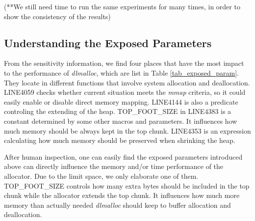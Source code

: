 (**We still need time to run the same experiments for many times, in order to show the consistency of the results)

\subsection{Understanding the Exposed Parameters}

\begin{table*}[htbp]
\centering
\caption{Exposed Parameters}
\label{tab_exposed_param}
\end{table*}
From the sensitivity information, we find four places that have the most impact to the performance of \emph{dlmalloc}, which are list in Table \ref{tab_exposed_param}. They locate in different functions that involve system allocation and deallocation. LINE4059 checks whether current situation meets the \emph{mmap} criteria, so it could easily enable or disable direct memory mapping. LINE4144 is also a predicate controling the extending of the heap. TOP\_FOOT\_SIZE in LINE4383 is a constant determined by some other macros and parameters. It influences how much memory should be always kept in the top chunk. LINE4353 is an expression calculating how much memory should be preserved when shrinking the heap.

After human inspection, one can easily find the exposed parameters introduced above can directly influence the memory and/or time performance of the allocator. Due to the limit space, we only elaborate one of them. TOP\_FOOT\_SIZE controls how many extra bytes should be included in the top chunk while the allocator extends the top chunk. It influences how much more memory than actually needed \emph{dlmalloc} should keep to buffer allocation and deallocation. 

